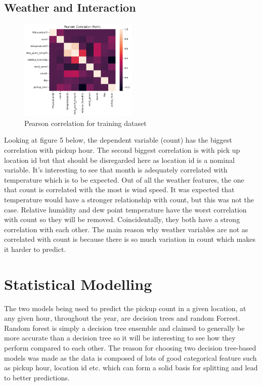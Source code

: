 \documentclass[11pt]{article}
\begin{document}
\subsection{Weather and Interaction}

\begin{figure}[h]
    \includegraphics[width=0.5\textwidth]{plots/weather.png}
    \centering
    \caption{Pearson correlation for training dataset} %
\end{figure}

Looking at figure 5 below, the dependent variable (count) has the biggest correlation with pickup hour. The second biggest correlation is with pick up location id but that should be disregarded here as location id is a nominal variable. It’s interesting to see that month is adequately correlated with temperature which is to be expected. Out of all the weather features, the one that count is correlated with the most is wind speed. It was expected that temperature would have a stronger relationship with count, but this was not the case. Relative humidity and dew point temperature have the worst correlation with count so they will be removed. Coincidentally, they both have a strong correlation with each other. The main reason why weather variables are not as correlated with count is because there is so much variation in count which makes it harder to predict.

\section{Statistical Modelling}
The two models being used to predict the pickup count in a given location, at any given hour, throughout the year, are decision trees and random Forrest. Random forest is simply a decision tree ensemble and claimed to generally be more accurate than a decision tree so it will be interesting to see how they perform compared to each other. The reason for choosing two decision tree-based models was made as the data is composed of lots of good categorical feature such as pickup hour, location id etc. which can form a solid basis for splitting and lead to better predictions.
\end{document}
